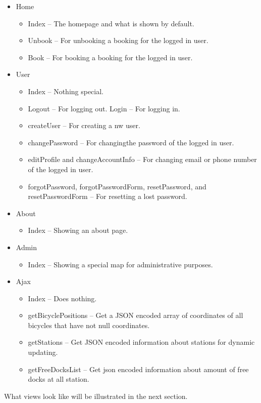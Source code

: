 \begin{itemize}
\item Home {\begin{itemize} 
            \item Index -- The homepage and what is shown by default.
            \item Unbook -- For unbooking a booking for the logged in user.
            \item Book -- For booking a booking for the logged in user.
            \end{itemize}}
\item User {\begin{itemize} 
            \item Index -- Nothing special.
            \item Logout -- For logging out.
            \itme Login -- For logging in.
            \item createUser -- For creating a nw user.
            \item changePassword -- For changingthe password of the logged in user.
            \item editProfile and changeAccountInfo -- For changing email or phone number of the logged in user.
            \item forgotPassword, forgotPasswordForm, resetPassword, and resetPasswordForm -- For resetting a lost password.
            \end{itemize}}
\item About {\begin{itemize} 
            \item Index -- Showing an about page.
            \end{itemize}}
\item Admin {\begin{itemize} 
            \item Index -- Showing a special map for administrative purposes.
            \end{itemize}}
\item Ajax {\begin{itemize} 
            \item Index -- Does nothing.
            \item getBicyclePositions -- Get a JSON encoded array of coordinates of all bicycles that have not null coordinates.
            \item getStations -- Get JSON encoded information about stations for dynamic updating.
            \item getFreeDocksList -- Get json encoded information about amount of free docks at all station.
            \end{itemize}}
\end{itemize}

What views look like will be illustrated in the next section.
